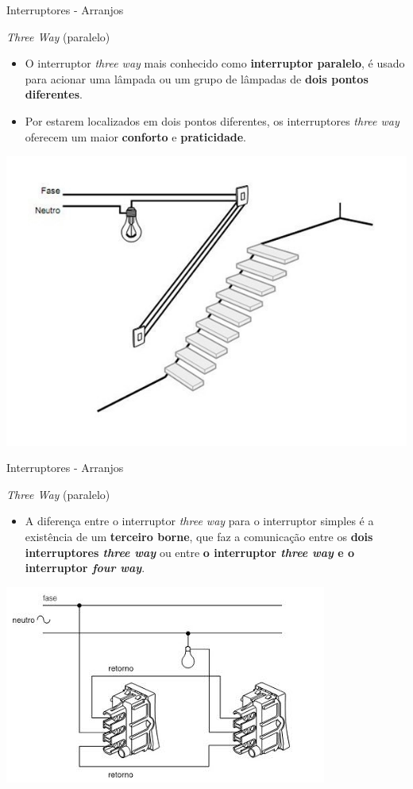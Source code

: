 \begin{frame}{Interruptores - Arranjos}
	\begin{block}{\textit{Three Way} (paralelo)}
		\begin{itemize}
			\item O interruptor \textit{three way} mais conhecido como \textbf{interruptor paralelo}, é usado para acionar uma lâmpada ou um grupo de lâmpadas de \textbf{dois pontos diferentes}.
			\item Por estarem localizados em dois pontos diferentes, os interruptores \textit{three way} oferecem um maior \textbf{conforto} e \textbf{praticidade}.
		\end{itemize}
	\end{block}

	\centering
	\includegraphics[width=0.55\linewidth]{Figuras/Ch08/fig4}
\end{frame}


\begin{frame}{Interruptores - Arranjos}
	\begin{block}{\textit{Three Way} (paralelo)}
		\begin{itemize}
			\item A diferença entre o interruptor \textit{three way} para o interruptor simples é a existência de um \textbf{terceiro borne}, que faz a comunicação entre os \textbf{dois interruptores \textit{three way}} ou entre \textbf{o interruptor \textit{three way} e o interruptor \textit{four way}}.
		\end{itemize}
	\end{block}

	\centering
	\includegraphics[width=0.6\linewidth]{Figuras/Ch08/fig5}
\end{frame}


